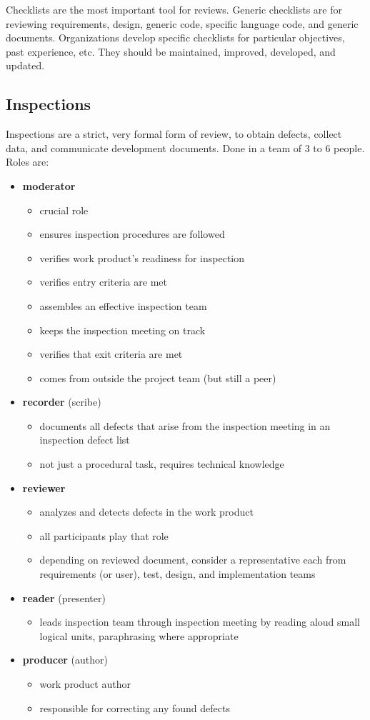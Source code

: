 \documentclass[11pt]{article}
\begin{document}
Checklists are the most important tool for reviews.
Generic checklists are for reviewing requirements, design, generic code, specific language code, and generic
documents.
Organizations develop specific checklists for particular objectives, past experience, etc.
They should be maintained, improved, developed, and updated.
\subsection{Inspections}
\label{sec:org5d368e4}
Inspections are a strict, very formal form of review, to obtain defects, collect data, and communicate
development documents.
Done in a team of 3 to 6 people.
Roles are:
\begin{itemize}
\item \textbf{moderator}
\begin{itemize}
\item crucial role
\item ensures inspection procedures are followed
\item verifies work product's readiness for inspection
\item verifies entry criteria are met
\item assembles an effective inspection team
\item keeps the inspection meeting on track
\item verifies that exit criteria are met
\item comes from outside the project team (but still a peer)
\end{itemize}
\item \textbf{recorder} (scribe)
\begin{itemize}
\item documents all defects that arise from the inspection meeting in an inspection defect list
\item not just a procedural task, requires technical knowledge
\end{itemize}
\item \textbf{reviewer}
\begin{itemize}
\item analyzes and detects defects in the work product
\item all participants play that role
\item depending on reviewed document, consider a representative each from requirements (or user),
test, design, and implementation teams
\end{itemize}
\item \textbf{reader} (presenter)
\begin{itemize}
\item leads inspection team through inspection meeting by reading aloud small logical units,
paraphrasing where appropriate
\end{itemize}
\item \textbf{producer} (author)
\begin{itemize}
\item work product author
\item responsible for correcting any found defects
\end{itemize}
\end{itemize}
\end{document}
